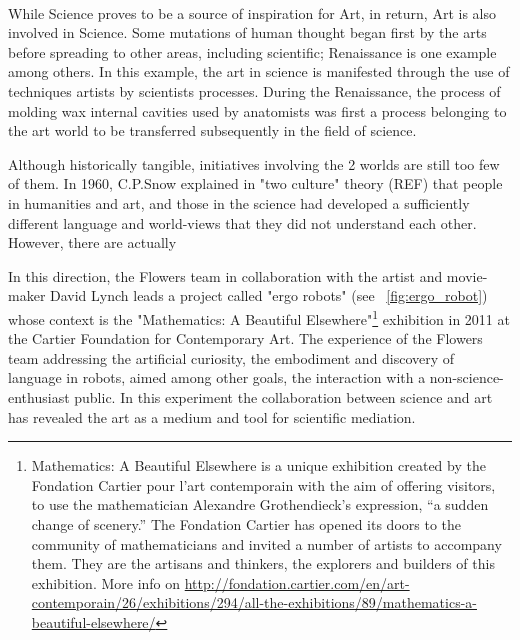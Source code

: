 \begin{figure}[]
\centering
    \\
    \hfil
    \caption{}
    \label{fig:chronophotography_history}
\end{figure}

While Science proves to be a source of inspiration for Art, in return, Art is also involved in Science. Some mutations of human thought began first by the arts before spreading to other areas, including scientific; Renaissance is one example among others. In this example, the art in science is manifested through the use of techniques artists by scientists processes. During the Renaissance, the process of molding wax internal cavities used by anatomists was first a process belonging to the art world to be transferred subsequently in the field of science.

Although historically tangible, initiatives involving the 2 worlds are still too few of them. In 1960, C.P.Snow explained in "two culture" theory (REF) that people in humanities and art, and those in the science had developed a sufficiently different language and world-views that they did not understand each other. However, there are actually

In this direction, the Flowers team in collaboration with the artist and movie-maker David Lynch leads a project called "ergo robots" (see \figurename~\ref{fig:ergo_robot}) whose context is the "Mathematics: A Beautiful Elsewhere"\footnote{Mathematics: A Beautiful Elsewhere is a unique exhibition created by the Fondation Cartier pour l’art contemporain with the aim of offering visitors, to use the mathematician Alexandre Grothendieck’s expression, “a sudden change of scenery.” The Fondation Cartier has opened its doors to the community of mathematicians and invited a number of artists to accompany them. They are the artisans and thinkers, the explorers and builders of this exhibition. More info on \url{http://fondation.cartier.com/en/art-contemporain/26/exhibitions/294/all-the-exhibitions/89/mathematics-a-beautiful-elsewhere/}} exhibition in 2011 at the Cartier Foundation for Contemporary Art. The experience of the Flowers team addressing the artificial curiosity, the embodiment and discovery of language in robots, aimed among other goals, the interaction with a non-science-enthusiast public. In this experiment the collaboration between science and art has revealed the art as a medium and tool for scientific mediation.


